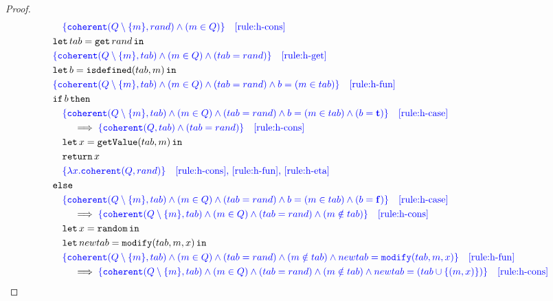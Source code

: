 \begin{proof}
{\begin{align*}
\begin{aligned}
    & \color{blue} \quad \{ \mathtt{coherent}(Q \setminus \{m\}, rand) \land (m \in Q) \} \quad \text{\ref{rule:h-cons}} \\
    &\letin{tab = \mathtt{get}\,rand}{} \\
    & \color{blue} \{ \mathtt{coherent}(Q \setminus \{m\}, tab) \land (m \in Q) \land (tab = rand) \} \quad \text{\ref{rule:h-get}} \\
    &\letin{b = \mathtt{isdefined}(tab, m)}{} \\
    & \color{blue} \{ \mathtt{coherent}(Q \setminus \{m\}, tab) \land (m \in Q) \land (tab = rand) \land b = (m \in tab) \} \quad \text{\ref{rule:h-fun}} \\
    &\mathtt{if}\, b\, \mathtt{then} \\
    & \quad \color{blue} \{ \mathtt{coherent}(Q \setminus \{m\}, tab) \land (m \in Q) \land (tab=rand) \land b=(m \in tab) \land (b=\true) \} \quad \text{\ref{rule:h-case}} \\
    & \qquad \implies \color{blue} \{ \mathtt{coherent}(Q, tab) \land (tab=rand) \} \quad \text{\ref{rule:h-cons}} \\
    & \quad \letin{x = \mathtt{getValue}(tab, m)}{} \\
    &\quad \return x \\
    & \color{blue} \quad \{ \lambda x.\mathtt{coherent}(Q, rand) \} \quad \text{\ref{rule:h-cons}, \ref{rule:h-fun}, \ref{rule:h-eta}} \\
    &\mathtt{else} \\
    & \quad \color{blue} \{ \mathtt{coherent}(Q \setminus \{m\}, tab) \land (m \in Q) \land (tab=rand) \land b=(m \in tab) \land (b=\false) \} \quad \text{\ref{rule:h-case}} \\
    & \qquad \implies \color{blue} \{ \mathtt{coherent}(Q \setminus \{m\}, tab) \land (m \in Q) \land (tab=rand) \land (m \notin tab) \} \quad \text{\ref{rule:h-cons}} \\
    &\quad \letin{x = \random}{} \\
    &\quad \letin{newtab = \mathtt{modify}(tab, m, x)}{} \\
    & \quad \color{blue}\{ \mathtt{coherent}(Q \setminus \{m\}, tab) \land (m \in Q) \land (tab=rand) \land (m \notin tab) \land newtab = \mathtt{modify}(tab, m, x) \} \quad \text{\ref{rule:h-fun}} \\
    & \qquad \implies \color{blue}\{ \mathtt{coherent}(Q \setminus \{m\}, tab) \land (m \in Q) \land (tab=rand) \land (m \notin tab) \land newtab = (tab \cup \{(m, x)\}) \} \quad \text{\ref{rule:h-cons}} \\

\end{aligned}
\end{align*}}
\end{proof}
